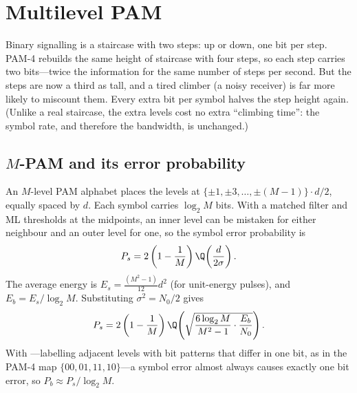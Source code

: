 \section{Multilevel PAM}
\label{sec:ch08:mpam}

\begin{analogy}
Binary signalling is a staircase with two steps: up or down, one bit per step. PAM-4 rebuilds
the same height of staircase with four steps, so each step carries two bits---twice the
information for the same number of steps per second. But the steps are now a third as tall,
and a tired climber (a noisy receiver) is far more likely to miscount them. Every extra bit per
symbol halves the step height again. (Unlike a real staircase, the extra levels cost no extra
``climbing time'': the symbol rate, and therefore the bandwidth, is unchanged.)
\end{analogy}


\subsection{\texorpdfstring{$M$}{M}-PAM and its error probability}

An $M$-level PAM alphabet places the levels at $\{\pm1,\pm3,\dots,\pm(M-1)\}\cdot d/2$, equally
spaced by $d$. Each symbol carries $\log_2M$ bits. With a matched filter and ML thresholds at the
midpoints, an inner level can be mistaken for either neighbour and an outer level for one, so
the symbol error probability is
\begin{equation}
P_s=2\left(1-\frac1M\right)\Q\!\left(\frac{d}{2\sigma}\right).
\end{equation}
The average energy is $E_s=\frac{(M^2-1)}{12}d^2$ (for unit-energy pulses), and
$E_b=E_s/\log_2M$. Substituting $\sigma^2=N_0/2$ gives
\begin{equation}
P_s=2\left(1-\frac1M\right)\Q\!\left(\sqrt{\frac{6\log_2M}{M^2-1}\cdot\frac{E_b}{N_0}}\right).
\label{eq:ch08:mpam}
\end{equation}
With ---labelling adjacent levels with bit patterns that differ in one bit, as
in the PAM-4 map $\{00,01,11,10\}$---a symbol error almost always causes exactly one bit
error, so $P_b\approx P_s/\log_2M$.

